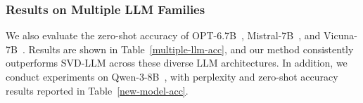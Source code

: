 \subsubsection{Results on Multiple LLM Families} \label{more_results_on_multiple}
We also evaluate the zero-shot accuracy of OPT-6.7B~\cite{zhang2022opt}, Mistral-7B~\cite{jiang2023mistral}, and Vicuna-7B~\cite{chiang2023vicuna}. Results are shown in Table~\ref{multiple-llm-acc}, and our method consistently outperforms SVD-LLM across these diverse LLM architectures.
In addition, we conduct experiments on Qwen-3-8B~\cite{yang2025qwen3}, with perplexity and zero-shot accuracy results reported in Table~\ref{new-model-acc}.

\begin{table}[t]
\centering
\caption{Performance of Qwen-3-8B under 20\% to 60\% compression ratios (``\textsc{Ratio}'').}
\label{new-model-acc}
\small
{}
\end{table}
